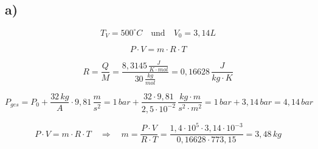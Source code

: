 

\subsection*{a)}

\[
T_V = 500^\circ C \quad \text{und} \quad V_0 = 3,14 L
\]

\[
P \cdot V = m \cdot R \cdot T
\]

\[
R = \frac{Q}{M} = \frac{8,3145 \, \frac{J}{K \cdot mol}}{30 \, \frac{kg}{mol}} = 0,16628 \, \frac{J}{kg \cdot K}
\]

\[
P_{ges} = P_0 + \frac{32 \, kg}{A} \cdot 9,81 \, \frac{m}{s^2} = 1 \, bar + \frac{32 \cdot 9,81}{2,5 \cdot 10^{-2}} \, \frac{kg \cdot m}{s^2 \cdot m^2} = 1 \, bar + 3,14 \, bar = 4,14 \, bar
\]

\[
P \cdot V = m \cdot R \cdot T \quad \Rightarrow \quad m = \frac{P \cdot V}{R \cdot T} = \frac{1,4 \cdot 10^5 \cdot 3,14 \cdot 10^{-3}}{0,16628 \cdot 773,15} = 3,48 \, kg
\]